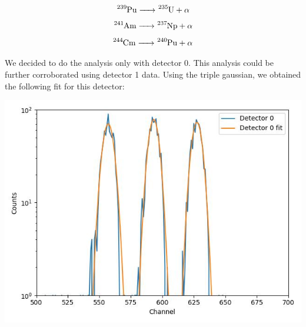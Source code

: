 \documentclass{article}
\begin{document}
\begin{multicols}{2}
\begin{equation}
    \ce{ ^{239}Pu -> ^{235}U + \alpha}
\end{equation}
\begin{equation}
    \ce{ ^{241}Am -> ^{237}Np + \alpha}
\end{equation}
\begin{equation}
    \ce{ ^{244}Cm -> ^{240}Pu + \alpha}
\end{equation}



We decided to do the analysis only with detector 0. This analysis could be further corroborated using detector 1 data.
Using the triple gaussian, we obtained the following fit for this detector:

\begin{center}
    \label{TT_21}
    \centering
    \includegraphics[scale = 0.5]{../../images/TT_21_Chn0.jpeg}
\end{center}

%


\end{multicols}
\end{document}
